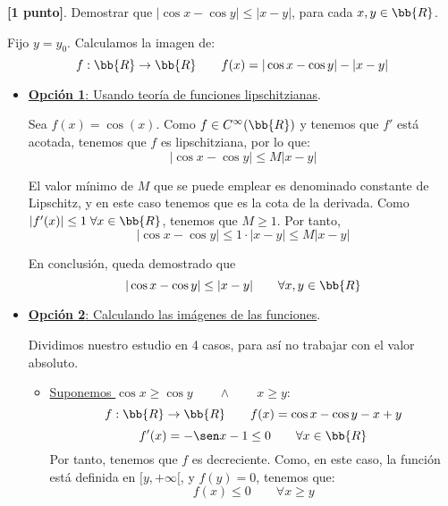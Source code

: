 \documentclass[12pt]{article}
\begin{document}
    \begin{ejercicio} \textbf{[1 punto]}. Demostrar que $|\cos x - \cos y| \leq |x-y|$, para cada $x,y\in \bb{R}$.

Fijo $y=y_0$. Calculamos la imagen de:
\begin{equation*}
    f:\bb{R}\to \bb{R} \qquad f(x)=|\cos x - \cos y| - |x-y|
\end{equation*}

\begin{itemize}
    \item \underline{\textbf{Opción 1}: Usando teoría de funciones lipschitzianas}.

    Sea $f(x)=\cos(x)$. Como $f\in C^\infty(\bb{R})$ y tenemos que $f'$ está acotada, tenemos que $f$ es lipschitziana, por lo que:
    \begin{equation*}
        |\cos x - \cos y| \leq M|x-y|
    \end{equation*}

    El valor mínimo de $M$ que se puede emplear es denominado constante de Lipschitz, y en este caso tenemos que es la cota de la derivada. Como $|f'(x)|\leq 1 \;\forall x\in \bb{R}$, tenemos que $M\geq 1$. Por tanto,
    \begin{equation*}
        |\cos x - \cos y| \leq 1\cdot |x-y| \leq M|x-y|
    \end{equation*}

    En conclusión, queda demostrado que 
    \begin{equation*}
        |\cos x - \cos y| \leq |x-y| \qquad \forall x,y\in \bb{R}
    \end{equation*}

    \item \underline{\textbf{Opción 2}: Calculando las imágenes de las funciones}.

    Dividimos nuestro estudio en 4 casos, para así no trabajar con el valor absoluto.
    \begin{itemize}
        \item \underline{Suponemos $\cos x \geq \cos y \qquad \land \qquad x\geq y$}:
        \begin{equation*}
            f:\bb{R}\to \bb{R} \qquad f(x)=\cos x - \cos y - x+y
        \end{equation*}
        \begin{equation*}
            f'(x) = -\sen x -1 \leq 0 \qquad \forall x\in \bb{R}
        \end{equation*}
        Por tanto, tenemos que $f$ es decreciente. Como, en este caso, la función está definida en $[y,+\infty[$, y $f(y)=0$, tenemos que:
        \begin{equation*}
            f(x)\leq 0 \qquad \forall x\geq y
        \end{equation*}
    

\end{itemize}
\end{itemize}
\end{ejercicio}
\end{document}
